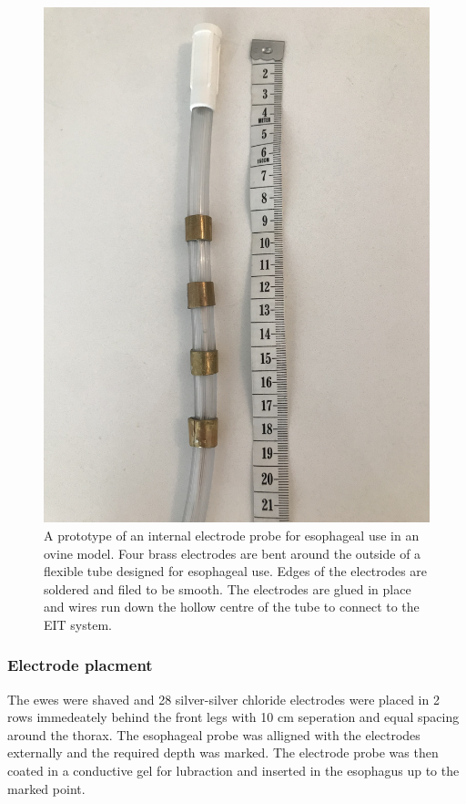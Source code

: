 \begin{figure}
    \centering
	\includegraphics[width=\textwidth, angle =-90]{chapter7-internal_elec_motion/imgs/probe_prototype.jpg} 
	\caption[Probe prototype]{\label{fig:probe_design} 
	A prototype of an internal electrode probe for esophageal use in an ovine model.
	Four brass electrodes are bent around the outside of a flexible tube designed for
	esophageal use. Edges of the electrodes are soldered and filed to be smooth. 
	The electrodes are glued in place and wires run down the hollow centre
	of the tube to connect to the EIT system.}
 \end{figure}

\subsubsection{Electrode placment}
The ewes were shaved and 28 silver-silver chloride electrodes were placed in 2 rows immedeately behind the front
legs with 10 cm seperation and equal spacing around the thorax. 
The esophageal probe was alligned with the electrodes externally and the required
depth was marked. The electrode probe was then coated in a conductive gel for lubraction and inserted in the 
esophagus up to the marked point.

